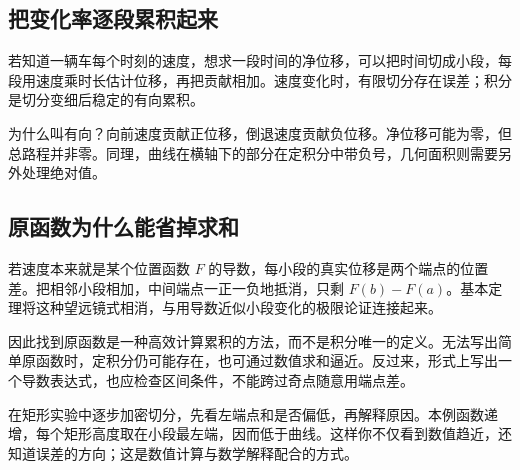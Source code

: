 \subsection*{把变化率逐段累积起来}
若知道一辆车每个时刻的速度，想求一段时间的净位移，可以把时间切成小段，每段用速度乘时长估计位移，再把贡献相加。速度变化时，有限切分存在误差；积分是切分变细后稳定的有向累积。

为什么叫有向？向前速度贡献正位移，倒退速度贡献负位移。净位移可能为零，但总路程并非零。同理，曲线在横轴下的部分在定积分中带负号，几何面积则需要另外处理绝对值。

\subsection*{原函数为什么能省掉求和}
若速度本来就是某个位置函数 $F$ 的导数，每小段的真实位移是两个端点的位置差。把相邻小段相加，中间端点一正一负地抵消，只剩 $F(b)-F(a)$。基本定理将这种望远镜式相消，与用导数近似小段变化的极限论证连接起来。

因此找到原函数是一种高效计算累积的方法，而不是积分唯一的定义。无法写出简单原函数时，定积分仍可能存在，也可通过数值求和逼近。反过来，形式上写出一个导数表达式，也应检查区间条件，不能跨过奇点随意用端点差。

在矩形实验中逐步加密切分，先看左端点和是否偏低，再解释原因。本例函数递增，每个矩形高度取在小段最左端，因而低于曲线。这样你不仅看到数值趋近，还知道误差的方向；这是数值计算与数学解释配合的方式。
